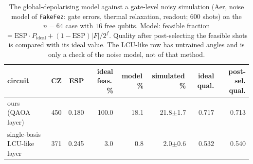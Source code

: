 \begin{table}[t]
\centering\footnotesize\setlength{\tabcolsep}{4pt}
\caption{ The global-depolarising model against a gate-level noisy simulation (Aer, noise model of \texttt{FakeFez}: gate errors, thermal relaxation, readout; $600$ shots) on the $n=64$ case with $16$ free qubits. Model: feasible fraction $=\mathrm{ESP}\cdot P_\mathrm{ideal}+(1-\mathrm{ESP})|F|/2^f$. Quality after post-selecting the feasible shots is compared with its ideal value. The LCU-like row has untrained angles and is only a check of the noise model, not of that method.}\label{tab:core_noise}
\begin{tabular}{lrrrrrrr}
\toprule
circuit & CZ & ESP & ideal feas.\,\% & model\,\% & simulated\,\% & ideal qual. & post-sel. qual.\\
\midrule
ours (QAOA layer) & 450 & 0.180 & 100.0 & 18.1 & 21.8$\pm$1.7 & 0.717 & 0.713\\
single-basis LCU-like layer & 371 & 0.245 & 3.0 & 0.8 & 2.0$\pm$0.6 & 0.532 & 0.540\\
\bottomrule
\end{tabular}
\end{table}
